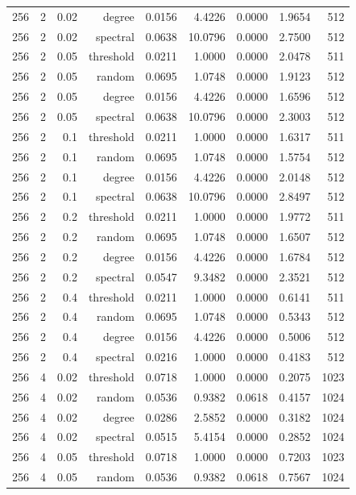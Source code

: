 \begin{table}[t]
\begin{tabular}{lrrrrrrrr}
256 & 2 & 0.02 & degree & 0.0156 & 4.4226 & 0.0000 & 1.9654 & 512 \\
256 & 2 & 0.02 & spectral & 0.0638 & 10.0796 & 0.0000 & 2.7500 & 512 \\
256 & 2 & 0.05 & threshold & 0.0211 & 1.0000 & 0.0000 & 2.0478 & 511 \\
256 & 2 & 0.05 & random & 0.0695 & 1.0748 & 0.0000 & 1.9123 & 512 \\
256 & 2 & 0.05 & degree & 0.0156 & 4.4226 & 0.0000 & 1.6596 & 512 \\
256 & 2 & 0.05 & spectral & 0.0638 & 10.0796 & 0.0000 & 2.3003 & 512 \\
256 & 2 & 0.1 & threshold & 0.0211 & 1.0000 & 0.0000 & 1.6317 & 511 \\
256 & 2 & 0.1 & random & 0.0695 & 1.0748 & 0.0000 & 1.5754 & 512 \\
256 & 2 & 0.1 & degree & 0.0156 & 4.4226 & 0.0000 & 2.0148 & 512 \\
256 & 2 & 0.1 & spectral & 0.0638 & 10.0796 & 0.0000 & 2.8497 & 512 \\
256 & 2 & 0.2 & threshold & 0.0211 & 1.0000 & 0.0000 & 1.9772 & 511 \\
256 & 2 & 0.2 & random & 0.0695 & 1.0748 & 0.0000 & 1.6507 & 512 \\
256 & 2 & 0.2 & degree & 0.0156 & 4.4226 & 0.0000 & 1.6784 & 512 \\
256 & 2 & 0.2 & spectral & 0.0547 & 9.3482 & 0.0000 & 2.3521 & 512 \\
256 & 2 & 0.4 & threshold & 0.0211 & 1.0000 & 0.0000 & 0.6141 & 511 \\
256 & 2 & 0.4 & random & 0.0695 & 1.0748 & 0.0000 & 0.5343 & 512 \\
256 & 2 & 0.4 & degree & 0.0156 & 4.4226 & 0.0000 & 0.5006 & 512 \\
256 & 2 & 0.4 & spectral & 0.0216 & 1.0000 & 0.0000 & 0.4183 & 512 \\
256 & 4 & 0.02 & threshold & 0.0718 & 1.0000 & 0.0000 & 0.2075 & 1023 \\
256 & 4 & 0.02 & random & 0.0536 & 0.9382 & 0.0618 & 0.4157 & 1024 \\
256 & 4 & 0.02 & degree & 0.0286 & 2.5852 & 0.0000 & 0.3182 & 1024 \\
256 & 4 & 0.02 & spectral & 0.0515 & 5.4154 & 0.0000 & 0.2852 & 1024 \\
256 & 4 & 0.05 & threshold & 0.0718 & 1.0000 & 0.0000 & 0.7203 & 1023 \\
256 & 4 & 0.05 & random & 0.0536 & 0.9382 & 0.0618 & 0.7567 & 1024 \\

\end{tabular}
\end{table}
